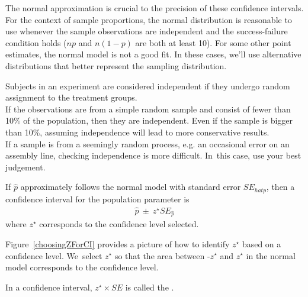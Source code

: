 The normal approximation is crucial to the precision of these
confidence intervals. For the context of sample proportions, the
normal distribution is reasonable to use whenever the sample
observations are independent and the success-failure condition
holds ($np$ and $n(1-p)$ are both at least 10).
For some other point estimates, the normal model is not a good fit.
In these cases, we'll use alternative distributions that better
represent the sampling distribution.

\begin{tipBox}{
  Subjects in an experiment are considered independent if they undergo
      random assignment to the treatment groups. \\[2mm]
  If the observations are from a simple random sample and consist
      of fewer than 10\% of the population, then they are independent.
      Even if the sample is bigger than 10\%, assuming independence
      will lead to more conservative results. \\[2mm]
  If a sample is from a seemingly random process,
      e.g. an occasional error on an assembly line,
      checking independence is more difficult. In~this case,
      use your best judgement.}
\end{tipBox}

\begin{termBox}{
  If $\hat{p}$ approximately follows the normal model with
  standard error $SE_{hat{p}}$, then a confidence interval
  for the population parameter is
  \begin{eqnarray*}
  \hat{p}\ \pm\ z^{\star} SE_{\hat{p}}
  \end{eqnarray*}
  where $z^{\star}$ corresponds to the confidence level selected.}
\end{termBox}

Figure~\ref{choosingZForCI} provides a picture of how to identify
$z^{\star}$ based on a confidence level. We~select $z^{\star}$
so that the area between -$z^{\star}$ and $z^{\star}$ in the normal
model corresponds to the confidence level. 

\begin{termBox}{
\label{marginOfErrorTermBox}
In a confidence interval, $z^{\star}\times SE$ is called the
.}
\end{termBox}

